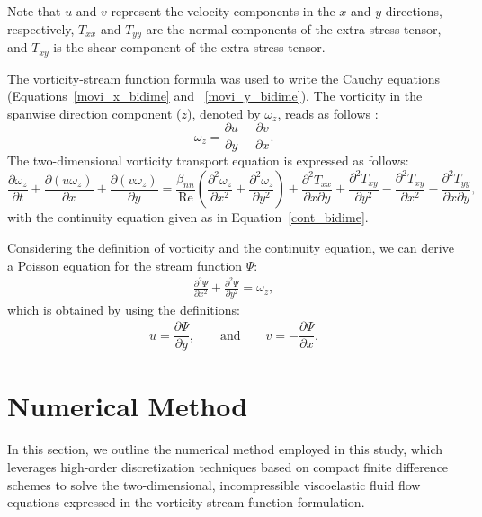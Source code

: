 \documentclass[preprint, 12pt]{elsarticle}
\begin{document}
Note that $u$ and $v$ represent the velocity components in the $x$ and $y$ directions, respectively, $T_{xx}$ and $T_{yy}$ are the normal components of the extra-stress tensor, and $T_{xy}$ is the shear component of the extra-stress tensor. 

The vorticity-stream function formula was used to write the Cauchy equations (Equations~\eqref{movi_x_bidime} and ~\eqref{movi_y_bidime}). The vorticity in the spanwise direction component ($z$), denoted by $\omega_{z}$, reads as follows \cite{roache72}:
\begin{equation}
    \omega_{z} = \dfrac{\partial u}{\partial y} - \dfrac{\partial v}{\partial x}.
\end{equation}
The two-dimensional vorticity transport equation is expressed as follows:
\begin{equation}
    \dfrac{\partial \omega_{z}}{\partial t}+\dfrac{\partial(u\omega_{z})}{\partial x}+\dfrac{\partial(v\omega_{z})}{\partial y} = \dfrac{\beta_{nn}}{\operatorname{Re}}\left( \dfrac{\partial^{2}\omega_{z}}{\partial x^{2}} + \dfrac{\partial^{2}\omega_{z}}{\partial y^{2}} \right)+\dfrac{\partial^{2}T_{xx}}{\partial x\partial y}+\dfrac{\partial^{2}T_{xy}}{\partial y^{2}}-\dfrac{\partial^{2}T_{xy}}{\partial x^{2}}-\dfrac{\partial^{2}T_{yy}}{\partial x\partial y},
\label{eq_vorticity_wz}
\end{equation}
with the continuity equation given as in Equation~\eqref{cont_bidime}.

Considering the definition of vorticity and the continuity equation, we can derive a Poisson equation for the stream function $\Psi$:
\begin{align}
    \frac{\partial^2 \Psi}{\partial x^2}+\frac{\partial^2 \Psi}{\partial y^2}= \omega_z,\label{eq_psi_vortic_corrent}
\end{align}
which is obtained by using the definitions:
\begin{align}
    u = \dfrac{\partial \Psi}{\partial y}, \qquad \textrm{and} \qquad v = - \dfrac{\partial \Psi}{\partial x}.\label{Psiy_u_Psix_v}
\end{align}

\section{Numerical Method}\label{sec_NumericalMethod}

In this section, we outline the numerical method employed in this study, which leverages high-order discretization techniques based on compact finite difference schemes to solve the two-dimensional, incompressible viscoelastic fluid flow equations expressed in the vorticity-stream function formulation.
\end{document}
